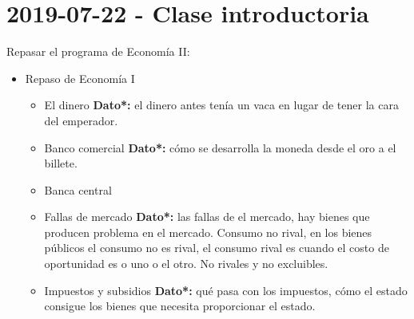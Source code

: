 \section{2019-07-22 - Clase introductoria}
Repasar el programa de Economía II:
\begin{itemize}
    \item Repaso de Economía I
    \begin{itemize}
        \item El dinero \textbf{Dato*:} el dinero antes tenía un vaca en lugar de tener la cara del emperador.
        \item Banco comercial \textbf{Dato*:} cómo se desarrolla la moneda desde el oro a el billete.
        \item Banca central 
        \item Fallas de mercado \textbf{Dato*:} las fallas de el mercado, hay bienes que producen problema en el mercado. Consumo no rival, en los bienes públicos el consumo no es rival, el consumo rival es cuando el costo de oportunidad es o uno o el otro. No rivales y no excluibles.
        \item Impuestos y subsidios \textbf{Dato*:} qué pasa con los impuestos, cómo el estado consigue los bienes que necesita proporcionar el estado.
    \end{itemize}
\end{itemize}
